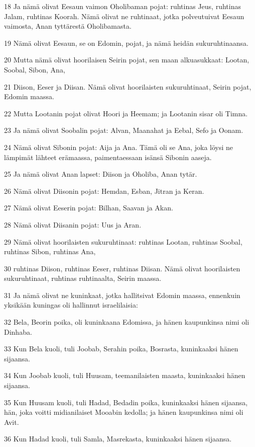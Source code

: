 \par 18 Ja nämä olivat Eesaun vaimon Oholibaman pojat: ruhtinas Jeus, ruhtinas Jalam, ruhtinas Koorah. Nämä olivat ne ruhtinaat, jotka polveutuivat Eesaun vaimosta, Anan tyttärestä Oholibamasta.
\par 19 Nämä olivat Eesaun, se on Edomin, pojat, ja nämä heidän sukuruhtinaansa.
\par 20 Mutta nämä olivat hoorilaisen Seirin pojat, sen maan alkuasukkaat: Lootan, Soobal, Sibon, Ana,
\par 21 Diison, Eeser ja Diisan. Nämä olivat hoorilaisten sukuruhtinaat, Seirin pojat, Edomin maassa.
\par 22 Mutta Lootanin pojat olivat Hoori ja Heemam; ja Lootanin sisar oli Timna.
\par 23 Ja nämä olivat Soobalin pojat: Alvan, Maanahat ja Eebal, Sefo ja Oonam.
\par 24 Nämä olivat Sibonin pojat: Aija ja Ana. Tämä oli se Ana, joka löysi ne lämpimät lähteet erämaassa, paimentaessaan isänsä Sibonin aaseja.
\par 25 Ja nämä olivat Anan lapset: Diison ja Oholiba, Anan tytär.
\par 26 Nämä olivat Diisonin pojat: Hemdan, Esban, Jitran ja Keran.
\par 27 Nämä olivat Eeserin pojat: Bilhan, Saavan ja Akan.
\par 28 Nämä olivat Diisanin pojat: Uus ja Aran.
\par 29 Nämä olivat hoorilaisten sukuruhtinaat: ruhtinas Lootan, ruhtinas Soobal, ruhtinas Sibon, ruhtinas Ana,
\par 30 ruhtinas Diison, ruhtinas Eeser, ruhtinas Diisan. Nämä olivat hoorilaisten sukuruhtinaat, ruhtinas ruhtinaalta, Seirin maassa.
\par 31 Ja nämä olivat ne kuninkaat, jotka hallitsivat Edomin maassa, ennenkuin yksikään kuningas oli hallinnut israelilaisia:
\par 32 Bela, Beorin poika, oli kuninkaana Edomissa, ja hänen kaupunkinsa nimi oli Dinhaba.
\par 33 Kun Bela kuoli, tuli Joobab, Serahin poika, Bosrasta, kuninkaaksi hänen sijaansa.
\par 34 Kun Joobab kuoli, tuli Huusam, teemanilaisten maasta, kuninkaaksi hänen sijaansa.
\par 35 Kun Huusam kuoli, tuli Hadad, Bedadin poika, kuninkaaksi hänen sijaansa, hän, joka voitti midianilaiset Mooabin kedolla; ja hänen kaupunkinsa nimi oli Avit.
\par 36 Kun Hadad kuoli, tuli Samla, Masrekasta, kuninkaaksi hänen sijaansa.
